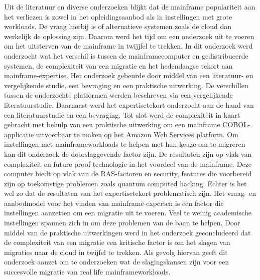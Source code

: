 Uit de literatuur en diverse onderzoeken blijkt dat de mainframe populariteit aan het verliezen is zowel in het opleidingsaanbod als in instellingen met grote workloads. De vraag hierbij is of alternatieve systemen zoals de cloud dan werkelijk de oplossing zijn. Daarom werd het tijd om een onderzoek uit te voeren om het uitsterven van de mainframe in twijjfel te trekken. In dit onderzoek werd onderzocht wat het verschil is tussen de mainframecomputer en gedistribueerde systemen, de complexiteit van een migratie en het hedendaagse tekort aan mainframe-expertise. Het onderzoek gebeurde door middel van een literatuur- en vergelijkende studie, een bevraging en een praktische uitwerking. De verschillen tussen de onderzochte platformen werden beschreven via een vergelijkende literatuurstudie. Daarnaast werd het expertisetekort onderzocht aan de hand van een literatuurstudie en een bevraging. Tot slot werd de complexiteit in kaart gebracht met behulp van een praktische uitwerking om een mainframe COBOL-applicatie uitvoerbaar te maken op het Amazon Web Services platform. Om instellingen met mainframeworkloads te helpen met hun keuze om te migreren kan dit onderzoek de doorslaggevende factor zijn. De resultaten zijn op vlak van complexiteit en future proof-technologie in het voordeel van de mainframe. Deze computer biedt op vlak van de RAS-factoren en security, features die voorbereid zijn op toekomstige problemen zoals quantum computed hacking. Echter is het wel zo dat de resultaten van het expertisetekort problematisch zijn. Het vraag- en aanbodmodel voor het vinden van mainframe-experten is een factor die instellingen aanzetten om een migratie uit te voeren. Veel te weinig academische instellingen spannen zich in om deze problemen van de baan te helpen. Door middel van de praktische uitwerkingen werd in het onderzoek geconcludeerd dat de complexiteit van een migratie een kritische factor is om het slagen van migraties naar de cloud in twijfel te trekken. Als gevolg hiervan geeft dit onderzoek aanzet om te onderzoeken wat de slagingskansen zijn voor een succesvolle migratie van real life mainframeworkloads. 